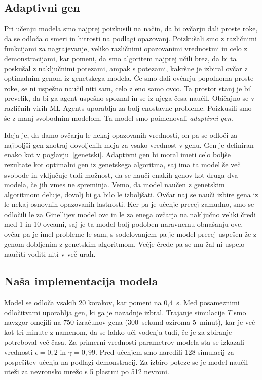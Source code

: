 \subsection{Adaptivni gen}

Pri učenju modela smo najprej poizkusili na način, da bi ovčarju dali proste roke, da se odloča o smeri in hitrosti na podlagi opazovanj. Poizkušali smo z različnimi funkcijami za nagrajevanje, veliko različnimi opazovanimi vrednostmi in celo z demonstracijami, kar pomeni, da smo algoritem najprej učili brez, da bi ta poskušal z naključnimi potezami, ampak s potezami, kakršne je izbiral ovčar z optimalnim genom iz genetskega modela. Če smo dali ovčarju popolnoma proste roke, se ni uspešno naučil niti sam, celo z eno samo ovco. Ta prostor stanj je bil prevelik, da bi ga agent uspešno spoznal in se iz njega česa naučil. Običajno se v različnih virih ML Agents uporablja za bolj enostavne probleme. Poizkusili smo še z manj svobodnim modelom. Ta model smo poimenovali \textit{adaptivni gen}.

Ideja je, da damo ovčarju le nekaj opazovanih vrednosti, on pa se odloči za najboljši gen znotraj dovoljenih meja za vsako vrednost v genu. Gen je definiran enako kot v poglavju~\ref{genetski}. Adaptivni gen bi moral imeti celo boljše rezultate kot optimalni gen iz genetskega algoritma, saj ima ta model še več svobode in vključuje tudi možnost, da se nauči enakih genov kot druga dva modela, če jih vmes ne spreminja. Vemo, da model naučen z genetskim algoritmom deluje, dovolj bi ga bilo le izboljšati. Ovčar naj se nauči izbire gena iz le nekaj osnovnih opazovanih lastnosti. Ker pa je učenje precej zamudno, smo se odločili le za Ginellijev model ovc in le za enega ovčarja na naključno veliki čredi med 1 in 10 ovcami, saj je ta model bolj podoben naravnemu obnašanju ovc, ovčar pa je imel probleme le sam, s sodelovanjem pa je model precej uspešen že z genom dobljenim z genetskim algoritmom. Večje črede pa se mu žal ni uspelo naučiti voditi niti v več urah.

\subsection{Naša implementacija modela}

Model se odloča vsakih 20 korakov, kar pomeni na 0,4~s. Med posameznimi odločitvami uporablja gen, ki ga je nazadnje izbral. Trajanje simulacije $T$ smo navzgor omejili na 750 izračunov gena (300~sekund oziroma 5~minut), kar je več kot tri minute z namenom, da se lahko uči vodenja tudi, če je za zbiranje potreboval več časa. Za primerni vrednosti parametrov modela sta se izkazali vrednosti $\epsilon=0,2$ in $\gamma=0,99$. Pred učenjem smo naredili 128 simulacij za pospešitev učenja na podlagi demonstracij. Za izbiro poteze se je model naučil uteži za nevronsko mrežo s 5 plastmi po 512 nevroni.

